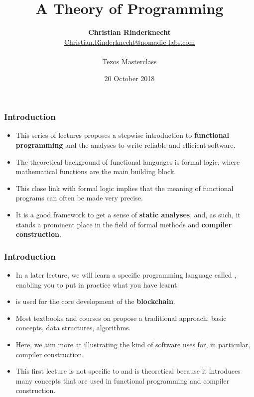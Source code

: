 \documentclass[compress,dvips,xcolor={dvipsnames},t]{beamer}
\title{A Theory of Programming}
\author{\textbf{Christian Rinderknecht}\\
  {\small\url{Christian.Rinderknecht@nomadic-labs.com}}\\
\Nomadic\\
Tezos Masterclass}
\date{20 October 2018}
\begin{document}
\frame{\maketitle}

\begin{frame}
  \frametitle{Introduction}

  \begin{itemize}

    \item This series of lectures proposes a stepwise introduction to
      \textbf{functional programming} and the analyses to write
      reliable and efficient software.

    \item The theoretical background of functional languages is formal
      logic, where mathematical functions are the main building block.

    \item This close link with formal logic implies that the meaning
      of functional programs can often be made very precise.

    \item It is a good framework to get a sense of \textbf{static
      analyses}, and, as such, it stands a prominent place in the
      field of formal methods and \textbf{compiler construction}.


  \end{itemize}
\end{frame}

\begin{frame}
  \frametitle{Introduction}

  \begin{itemize}

    \item In a later lecture, we will learn a specific programming
      language called \textbf{\OCaml}, enabling you to put in practice
      what you have learnt.

    \item \OCaml is used for the core development of the \Tezos
      \textbf{blockchain}.

    \item Most textbooks and courses on \OCaml propose a traditional
      approach: basic concepts, data structures, algorithms.

    \item Here, we aim more at illustrating the kind of software
      \Tezos uses \OCaml for, in particular, compiler construction.

    \item This first lecture is not specific to \OCaml and is
      theoretical because it introduces many concepts that are used in
      functional programming and compiler construction.

  \end{itemize}

\end{frame}
\end{document}
